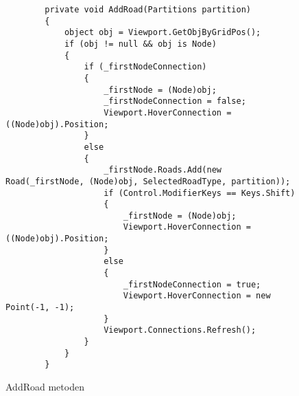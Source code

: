 \begin{figure}[H]
\begin{lstlisting}
        private void AddRoad(Partitions partition)
        {
            object obj = Viewport.GetObjByGridPos();
            if (obj != null && obj is Node)
            {
                if (_firstNodeConnection)
                {
                    _firstNode = (Node)obj;
                    _firstNodeConnection = false;
                    Viewport.HoverConnection = ((Node)obj).Position;
                }
                else
                {
                    _firstNode.Roads.Add(new Road(_firstNode, (Node)obj, SelectedRoadType, partition));
                    if (Control.ModifierKeys == Keys.Shift)
                    {
                        _firstNode = (Node)obj;
                        Viewport.HoverConnection = ((Node)obj).Position;
                    }
                    else
                    {
                        _firstNodeConnection = true;
                        Viewport.HoverConnection = new Point(-1, -1);
                    }
                    Viewport.Connections.Refresh();
                }
            }
        }
\end{lstlisting}
\caption{AddRoad metoden}\label{AddRoadCode}
\end{figure}



















